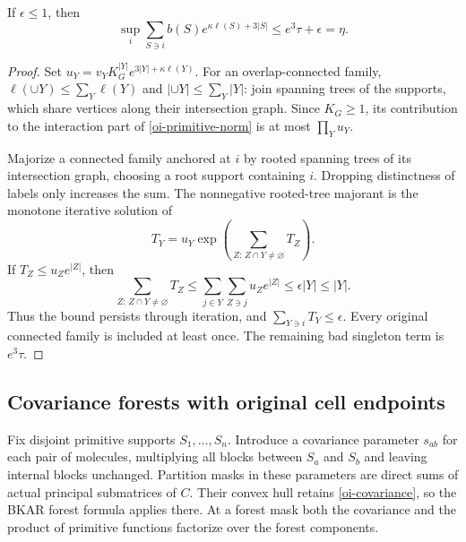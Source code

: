 \begin{lemma}\label{oi-animal}
If $\epsilon\le1$, then
\begin{equation}\label{oi-primitive-norm}
 \sup_i\sum_{S\ni i}b(S)e^{\kappa\ell(S)+3|S|}
       \le e^3\tau+\epsilon=\eta .
\end{equation}
\end{lemma}
\begin{proof}
Set $u_Y=v_YK_G^{|Y|}e^{3|Y|+\kappa\ell(Y)}$.
For an overlap-connected family,
$\ell(\cup Y)\le\sum_Y\ell(Y)$ and
$|\cup Y|\le\sum_Y|Y|$: join spanning trees of the supports,
which share vertices along their intersection graph.
Since $K_G\ge1$, its contribution to the interaction part of
\eqref{oi-primitive-norm} is at most $\prod_Yu_Y$.

Majorize a connected family anchored at $i$ by rooted spanning
trees of its intersection graph, choosing a root support containing
$i$. Dropping distinctness of labels only increases the sum.
The nonnegative rooted-tree majorant is the monotone iterative
solution of
\[
 T_Y=u_Y\exp\left(\sum_{Z:\,Z\cap Y\ne\varnothing}T_Z\right).
\]
If $T_Z\le u_Ze^{|Z|}$, then
\[
 \sum_{Z:\,Z\cap Y\ne\varnothing}T_Z
 \le\sum_{j\in Y}\sum_{Z\ni j}u_Ze^{|Z|}
 \le\epsilon |Y|\le |Y|.
 \]
Thus the bound persists through iteration, and
$\sum_{Y\ni i}T_Y\le\epsilon$. Every original connected family
is included at least once. The remaining bad singleton term is
$e^3\tau$.
\end{proof}

\subsection{Covariance forests with original cell endpoints}

Fix disjoint primitive supports $S_1,\ldots,S_n$. Introduce a
covariance parameter $s_{ab}$ for each pair of molecules, multiplying
all blocks between $S_a$ and $S_b$ and leaving internal blocks
unchanged. Partition masks in these parameters are direct sums of
actual principal submatrices of $C$. Their convex hull retains
\eqref{oi-covariance}, so the BKAR forest formula applies there.
At a forest mask both the covariance and the product of primitive
functions factorize over the forest components.


